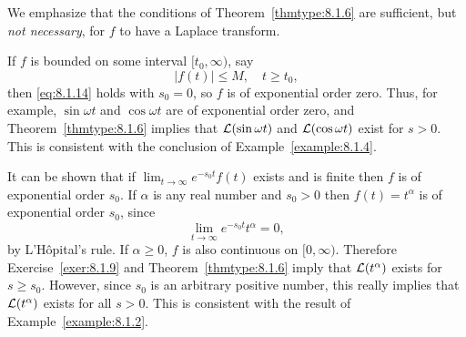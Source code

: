 \documentclass{ximera}
\begin{document}
\begin{remark}
We emphasize that the conditions of Theorem~\ref{thmtype:8.1.6}
 are sufficient, but \textit{not necessary}, for $f$ to have a Laplace transform. 
\end{remark}

\begin{example}\label{example:8.1.8}
If $f$ is bounded on some interval $[t_0,\infty)$, say
$$
|f(t)| \leq M,\quad t \geq t_0,
$$
then \eqref{eq:8.1.14} holds with $s_0=0$, so $f$ is of exponential order
zero. Thus, for example, $\sin\omega t$ and $\cos \omega t$ are of
exponential order zero, and Theorem~\ref{thmtype:8.1.6} implies that
${\cal L}(\sin\omega t)$ and ${\cal L}(\cos \omega t)$ exist for
$s>0$. This is consistent with the conclusion of
Example~\ref{example:8.1.4}.
\end{example}

\begin{example}\label{example:8.1.9}
It can be shown that if $\lim_{t\rightarrow\infty}e^{-s_0t}f(t)$ exists and is
finite then $f$ is of exponential order $s_0$.
If $\alpha$ is any real number and $s_0>0$
then $f(t)=t^\alpha$ is of exponential order $s_0$, since
$$
\lim_{t\rightarrow\infty}e^{-s_0t}t^\alpha=0,
$$
by L'H\^opital's rule. If $\alpha\geq 0$, $f$ is also
continuous on $[0,\infty)$. Therefore Exercise~\ref{exer:8.1.9} and
Theorem~\ref{thmtype:8.1.6} imply that ${\cal L}(t^\alpha)$ exists for
$s\geq s_0$. However, since $s_0$ is an arbitrary positive number, this
really implies that ${\cal L}(t^\alpha)$ exists for all $s>0$. This is
consistent with the result of Example~\ref{example:8.1.2}.
\end{example}
\end{document}
